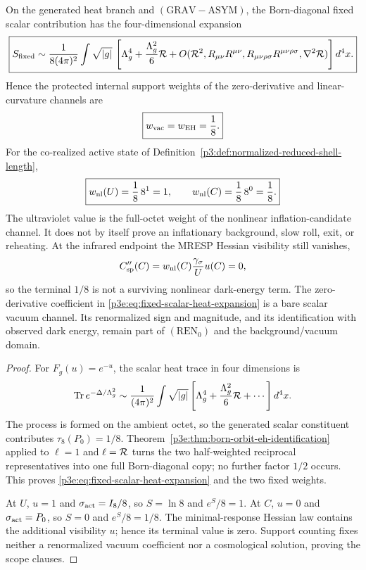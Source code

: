 \documentclass[12pt,a4paper]{article}
\begin{document}
\begin{theorem}
\label{p3e:thm:fixed-scalar-and-active-weights}
On the generated heat branch and
\((\mathrm{GRAV\!-\!ASYM})\), the Born-diagonal fixed scalar contribution has
the four-dimensional expansion
\begin{equation}
\label{p3e:eq:fixed-scalar-heat-expansion}
 \boxed{
 S_{\rm fixed}\sim
 \frac1{8(4\pi)^2}\int\sqrt{|g|}\,
 \left[\Lambda_g^4+\frac{\Lambda_g^2}{6}\mathcal R
 +O(\mathcal R^2,R_{\mu\nu}R^{\mu\nu},
 R_{\mu\nu\rho\sigma}R^{\mu\nu\rho\sigma},\nabla^2\mathcal R)\right]d^4x.}
\end{equation}
Hence the protected internal support weights of the zero-derivative and
linear-curvature channels are
\[
 \boxed{w_{\rm vac}=w_{\rm EH}=\frac18.}
\]
For the co-realized active state of
Definition~\ref{p3:def:normalized-reduced-shell-length},
\[
 \boxed{w_{\rm nl}(U)=\frac18\,8^1=1,\qquad
        w_{\rm nl}(C)=\frac18\,8^0=\frac18.}
\]
The ultraviolet value is the full-octet weight of the nonlinear
inflation-candidate channel.  It does not by itself prove an inflationary
background, slow roll, exit, or reheating.  At the infrared endpoint the
MRESP Hessian visibility still vanishes,
\[
 C_{\rm sp}''(C)
 =w_{\rm nl}(C)\frac{\gamma_\sigma}{U}u(C)=0,
\]
so the terminal \(1/8\) is not a surviving nonlinear dark-energy term.
The zero-derivative coefficient in
\eqref{p3e:eq:fixed-scalar-heat-expansion} is a bare scalar vacuum channel.
Its renormalized sign and magnitude, and its identification with observed dark
energy, remain part of \((\mathrm{REN}_0)\) and the background/vacuum domain.
\end{theorem}

\begin{proof}
For \(F_g(u)=e^{-u}\), the scalar heat trace in four dimensions is
\[
 \operatorname{Tr} e^{-\Delta/\Lambda_g^2}
 \sim\frac1{(4\pi)^2}\int\sqrt{|g|}
 \left[\Lambda_g^4+\frac{\Lambda_g^2}{6}\mathcal R+\cdots\right]d^4x.
\]
The process is formed on the ambient octet, so the generated scalar
constituent contributes \(\tau_8(P_0)=1/8\).  Theorem~\ref{p3e:thm:born-orbit-eh-identification}
applied to \(\ell=1\) and \(\ell=\mathcal R\) turns the two half-weighted
reciprocal representatives into one full Born-diagonal copy; no further
factor \(1/2\) occurs.  This proves
\eqref{p3e:eq:fixed-scalar-heat-expansion} and the two fixed weights.

At \(U\), \(u=1\) and
\(\sigma_{\rm act}=I_8/8\), so \(S=\ln8\) and
\(e^S/8=1\).  At \(C\), \(u=0\) and
\(\sigma_{\rm act}=P_0\), so \(S=0\) and \(e^S/8=1/8\).
The minimal-response Hessian law contains the additional visibility \(u\);
hence its terminal value is zero.  Support counting fixes neither a
renormalized vacuum coefficient nor a cosmological solution, proving the
scope clauses.
\end{proof}
\end{document}
